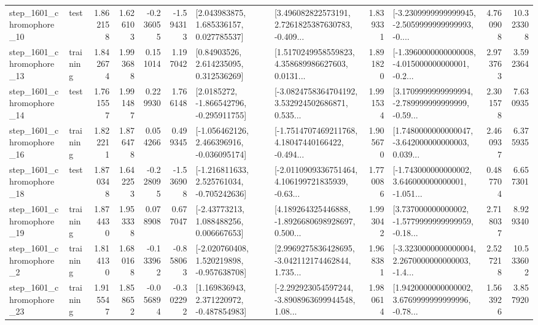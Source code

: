 \begin{tabular}{llrrrrllrlrr}
 step\_1601\_chromophore\_10 &      test &      1.862158 &    1.626103 &     -0.236055 & -1.594313 &     [2.043983875, 1.685336157, 0.027785537] &  [3.496082822573191, 2.7261825387630783, -0.409... &       1.839331 &  [-3.2309999999999945, -2.5059999999999993, -0.... &            4.760908 &         10.323308 \\
 step\_1601\_chromophore\_13 &  training &      1.842674 &    1.993688 &      0.151014 &  1.197042 &      [0.84903526, 2.614235095, 0.312536269] &  [1.5170249958559823, 4.358689986627603, 0.0131... &       1.891820 &  [-1.3960000000000008, -4.015000000000001, -0.2... &            2.973763 &          3.592364 \\
 step\_1601\_chromophore\_14 &      test &      1.761557 &    1.991487 &      0.229930 &  1.766148 &     [2.0185272, -1.866542796, -0.295911755] &  [-3.0824758364704192, 3.532924502686871, 0.535... &       1.991534 &  [3.1709999999999994, -2.789999999999999, -0.59... &            2.301578 &          7.630935 \\
 step\_1601\_chromophore\_16 &  training &      1.822211 &    1.876478 &      0.054266 &  0.499345 &   [-1.056462126, 2.466396916, -0.036095174] &  [-1.7514707469211768, 4.18047440166422, -0.494... &       1.905670 &  [1.7480000000000047, -3.642000000000003, 0.039... &            2.460937 &          6.375935 \\
 step\_1601\_chromophore\_18 &      test &      1.870348 &    1.642253 &     -0.228095 & -1.536908 &   [-1.216811633, 2.525761034, -0.705242636] &  [-2.0110909336751464, 4.106199721835939, -0.63... &       1.770086 &  [-1.743000000000002, 3.646000000000001, -1.051... &            0.487704 &          6.657301 \\
 step\_1601\_chromophore\_19 &  training &      1.874430 &    1.953338 &      0.078908 &  0.677047 &     [-2.43773213, 1.088488256, 0.006667653] &  [4.189264325446888, -1.8926680698928697, 0.500... &       1.993042 &  [3.737000000000002, -1.5779999999999959, -0.18... &            2.718037 &          8.929340 \\
  step\_1601\_chromophore\_2 &  training &      1.814130 &    1.680168 &     -0.133962 & -0.858063 &   [-2.020760408, 1.520219898, -0.957638708] &  [2.9969275836428695, -3.042112174462844, 1.735... &       1.968381 &  [-3.3230000000000004, 2.2670000000000003, -1.4... &            2.527218 &         10.533602 \\
 step\_1601\_chromophore\_23 &  training &      1.915547 &    1.858652 &     -0.056894 & -0.302292 &    [1.169836943, 2.371220972, -0.487854983] &  [-2.292923054597244, -3.8908963699944548, 1.08... &       1.980614 &  [1.9420000000000002, 3.6769999999999996, -0.78... &            1.563926 &          3.857920 \\

\end{tabular}
